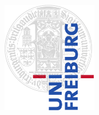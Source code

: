 \documentclass[11pt,twoside,a4paper,final]{report}
\begin{document}
\newcommand{\mgl}{mg l$^{-1}$}
\newcommand{\mmoll}{mmol l$^{-1}$}
\newcommand{\meql}{meq l$^{-1}$}
\newcommand{\muscm}{$\mu$S cm$^{-1}$}
\newcommand{\water}{H$_2$O}
\newcommand{\kion}{K$^+$}
\newcommand{\naion}{Na$^+$}
\newcommand{\caion}{Ca$^{2+}$}
\newcommand{\mgion}{Mg$^{2+}$}
\newcommand{\clion}{Cl$^-$}
\newcommand{\nitrate}{NO$_3^-$}
\newcommand{\nitrite}{NO$_2^-$}
\newcommand{\nhion}{NH$_4^+$}
\newcommand{\hcoion}{HCO$_3^-$}
\newcommand{\hardness}{Ca$^{2+}$ + Mg$^{2+}$}


\pagestyle{empty}

\begin{figure}[h]
  \begin{flushright}
    \vspace{-2cm}
    \includegraphics[width=4cm]{images/ufcd-logo-e1-a4-color} %
  \end{flushright}
\end{figure}
\end{document}
